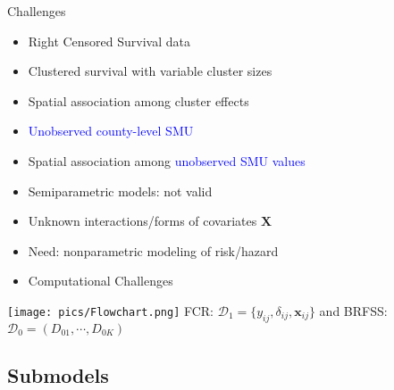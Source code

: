 \documentclass{beamer}
\begin{document}
\begin{frame}{Challenges}
\protect\hypertarget{challenges}{}
\begin{itemize}
\vfill \item
  Right Censored Survival data
\vfill \item
  Clustered survival with variable cluster sizes
\vfill \item
  Spatial association among cluster effects

\vfill \item
\textcolor{blue}{Unobserved county-level SMU}

\vfill \item
  Spatial association among \textcolor{blue}{unobserved SMU values}

\medskip

\vfill \item
 Semiparametric models: not valid

\vfill \item Unknown interactions/forms of covariates $\mathbf{X}$

\vfill \item Need: nonparametric modeling of risk/hazard


\vfill \item 
  Computational Challenges
\end{itemize}
\end{frame}



\begin{frame}{}
\texttt{[image: pics/Flowchart.png]}
    FCR: $\mathcal{D}_1=\{y_{ij},\delta_{ij},\mathbf{x}_{ij}\}$  and   BRFSS: $\mathcal{D}_0=(D_{01},\cdots,D_{0K})$
\end{frame}

\subsection{Submodels}
\end{document}
